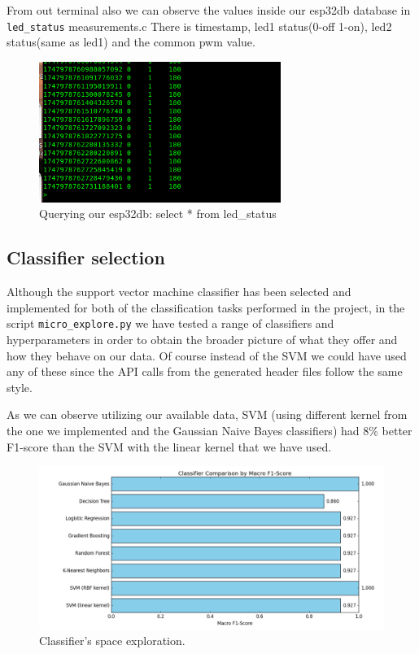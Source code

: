 \documentclass[a4paper,12pt]{article}
\begin{document}
	From out terminal also we can observe the values inside our esp32db database in \texttt{led\_status} measurements.c
	There is timestamp, led1 status(0-off 1-on), led2 status(same as led1) and the common pwm value.
		\begin{figure}[H]
			\centering
			\includegraphics[width=0.7\textwidth]{influx.png}
			\caption{Querying our esp32db: select * from led\_status}
			\label{fig1:}
		\end{figure}		






	\subsection{Classifier selection}
	Although the support vector machine classifier has been selected and implemented for both of the 
	classification tasks performed in the project, in the script \texttt{micro\_explore.py}
	we have tested a range of classifiers and hyperparameters in order to obtain the broader picture of what they offer and 
	how they behave on our data. Of course instead of the SVM we could have used any of these since the API calls from the generated header
	files follow the same style.
	
	As we can observe utilizing our available data, 
	SVM (using different kernel from the one we implemented and the Gaussian Naive Bayes classifiers) had 8\% 
	better F1-score than the SVM with the linear kernel that we have used.
	
		\begin{figure}[H]
			\centering
			\includegraphics[width=1\textwidth]{micro_xplore.png}
			\caption{Classifier's space exploration.}
			\label{fig1:}
		\end{figure}		
\end{document}
